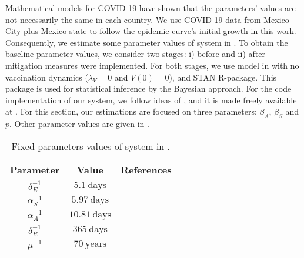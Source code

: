\label{App:Parameter_Est}
Mathematical models for COVID-19 have shown that the
parameters' values are not necessarily the same in each country. We
use COVID-19 data from Mexico City plus Mexico state to follow the
epidemic curve's initial growth in this work. Consequently, we
estimate some parameter values of system in 
\cite{DataMX}. To obtain the baseline parameter values, we consider
two-stages: i) before and ii) after mitigation measures were
implemented. For both stages, we use model in  with no
vaccination dynamics ($\lambda_V = 0$ and $V(0) = 0$), and STAN
R-package. This package is used for statistical inference by the
Bayesian approach. For the code implementation of our system, we
follow ideas of \cite{Chatzilena2019}, and it is made freely available
at \cite{gitHub}. For this section, our estimations are focused on
three parameters: $\beta_A$, $\beta_S$ and $p$. Other parameter values
are given in .
\begin{table}[h!]
\begin{center}
	\begin{tabular}{ccc}
		\toprule
		Parameter & Value & References
		\\
		\midrule
		$\delta_{E}^{-1}$ & $5.1\ \text{days}$   &  \cite{Tian2020}
		\\
		$\alpha_{S}^{-1}$  & $5.97\ \text{days}$  &  \cite{Acuna2020}
		\\
		$\alpha_{A}^{-1}$ & $10.81\ \text{days}$ & \cite{Acuna2020}
		\\
		$\delta_{R}^{-1}$ & $365\ \text{days}$     &
		\\
		$\mu^{-1}$        & $70\ \text{years}$   &
		\\
		\bottomrule
		\end{tabular}
		\caption{Fixed parameters values of system in
		.}\label{table_fixparam}
	\end{center}
\end{table}

